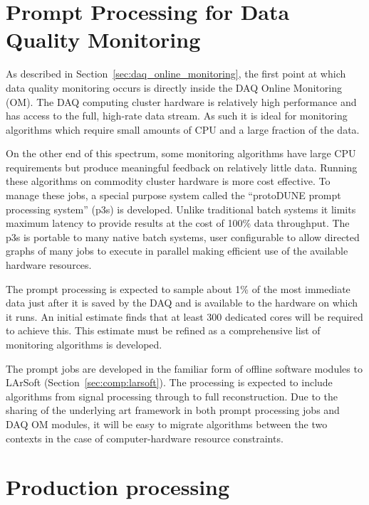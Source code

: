 \section{Prompt Processing for Data Quality Monitoring}
\label{sec:prompt_processing}

As described in Section~\ref{sec:daq_online_monitoring}, the first
point at which data quality monitoring occurs is directly inside the
DAQ Online Monitoring (OM).  The DAQ computing cluster hardware is
relatively high performance and has access to the full, high-rate data
stream.  As such it is ideal for monitoring algorithms which require
small amounts of CPU and a large fraction of the data.

On the other end of this spectrum, some monitoring algorithms have
large CPU requirements but produce meaningful feedback on relatively
little data.  Running these algorithms on commodity cluster hardware
is more cost effective.  To manage these jobs, a special purpose system
called the ``protoDUNE prompt processing system'' (p3s) is developed.
Unlike traditional batch systems it limits maximum latency to provide
results at the cost of 100\% data throughput.  The p3s is portable to
many native batch systems, user configurable to allow directed graphs
of many jobs to execute in parallel making efficient use of the
available hardware resources. 

The prompt processing is expected to sample about 1\% of the most
immediate data just after it is saved by the DAQ and is available to the
hardware on which it runs.  An initial estimate finds that at least
300 dedicated cores will be required to achieve this.  This estimate
must be refined as a comprehensive list of monitoring algorithms is
developed.

The prompt jobs are developed in the familiar form of offline software
modules to LArSoft (Section~\ref{sec:comp:larsoft}).  The processing is expected to include algorithms
from signal processing through to full reconstruction.  Due to the
sharing of the underlying art framework in both prompt processing jobs and
DAQ OM modules, it will be easy to migrate algorithms between the two
contexts in the case of computer-hardware resource constraints.

\section{Production processing}
\label{sec:protodune-offline}

